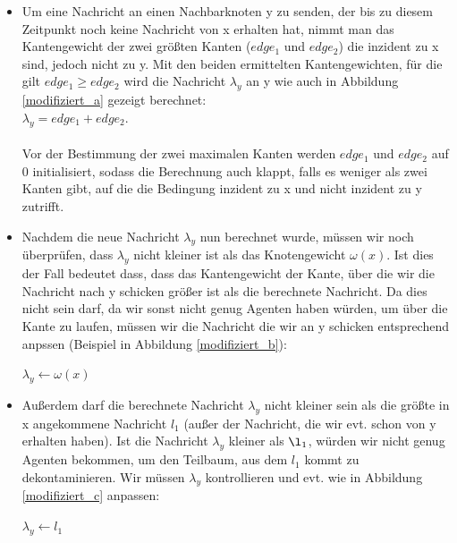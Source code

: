 \begin{itemize}
	
	\item 
		Um eine Nachricht an einen Nachbarknoten y zu senden, der bis zu diesem Zeitpunkt noch keine Nachricht von x erhalten hat, nimmt man das Kantengewicht der zwei größten Kanten ($edge_{1}$ und $edge_{2}$) die inzident zu x sind, jedoch nicht zu y. Mit den beiden ermittelten Kantengewichten, für die gilt $edge_{1} \ge edge_{2}$ wird die Nachricht $\lambda_{y}$ an y wie auch in Abbildung \ref{modifiziert_a} gezeigt berechnet:\\
		$\lambda_{y} = edge_{1} + edge_{2}$.
		\\
		\\
		Vor der Bestimmung der zwei maximalen Kanten werden $edge_{1}$ und $edge_{2}$ auf 0 initialisiert, sodass die Berechnung auch klappt, falls es weniger als zwei Kanten gibt, auf die die Bedingung inzident zu x und nicht inzident zu y  zutrifft.
	
	\item
		Nachdem die neue Nachricht $\lambda_{y}$ nun berechnet wurde, müssen wir noch überprüfen, dass $\lambda_{y}$ nicht kleiner ist als das Knotengewicht $\omega(x)$. Ist dies der Fall bedeutet dass, dass das Kantengewicht der Kante, über die wir die Nachricht nach y schicken größer ist als die berechnete Nachricht. Da dies nicht sein darf, da wir sonst nicht genug Agenten haben würden, um über die Kante zu laufen, müssen wir die Nachricht die wir an y schicken entsprechend anpssen (Beispiel in Abbildung \ref{modifiziert_b}):
		
		\begin{algorithmic}
			\State $\lambda_{y} \gets \omega(x)$
			\EndIf
		\end{algorithmic}
	
	\item
		Außerdem darf die berechnete Nachricht $\lambda_{y}$ nicht kleiner sein als die größte in x angekommene Nachricht $l_{1}$ (außer der Nachricht, die wir evt. schon von y erhalten haben). Ist die Nachricht $\lambda_{y}$ kleiner als $\l_{1}$, würden wir nicht genug Agenten bekommen, um den Teilbaum, aus dem $l_{1}$ kommt zu dekontaminieren. Wir müssen $\lambda_{y}$ kontrollieren und evt. wie in Abbildung \ref{modifiziert_c} anpassen:
		
		\begin{algorithmic}
			\If {$\lambda_{y} < l_{1}$}
			\State $\lambda_{y} \gets l_{1}$
			\EndIf
		\end{algorithmic}
	
\end{itemize}


